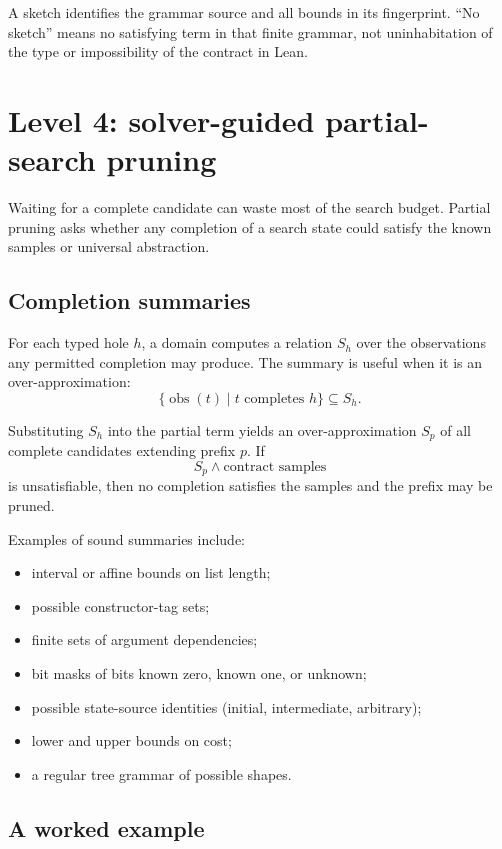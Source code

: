 \documentclass[11pt,oneside]{report}
\begin{document}
A sketch identifies the grammar source and all bounds in its fingerprint. ``No sketch'' means no satisfying term in that finite grammar, not uninhabitation of the type or impossibility of the contract in Lean.

\section{Level 4: solver-guided partial-search pruning}
\label{sec:prefix-pruning}

Waiting for a complete candidate can waste most of the search budget. Partial pruning asks whether any completion of a search state could satisfy the known samples or universal abstraction.

\subsection{Completion summaries}

For each typed hole $h$, a domain computes a relation $S_h$ over the observations any permitted completion may produce. The summary is useful when it is an over-approximation:
\[
  \{\operatorname{obs}(t) \mid t\text{ completes }h\} \subseteq S_h.
\]

Substituting $S_h$ into the partial term yields an over-approximation $S_p$ of all complete candidates extending prefix $p$. If
\[
  S_p \land \text{contract samples}
\]
is unsatisfiable, then no completion satisfies the samples and the prefix may be pruned.

Examples of sound summaries include:

\begin{itemize}[leftmargin=2em]
\item interval or affine bounds on list length;
\item possible constructor-tag sets;
\item finite sets of argument dependencies;
\item bit masks of bits known zero, known one, or unknown;
\item possible state-source identities (initial, intermediate, arbitrary);
\item lower and upper bounds on cost;
\item a regular tree grammar of possible shapes.
\end{itemize}

\subsection{A worked example}
\end{document}
